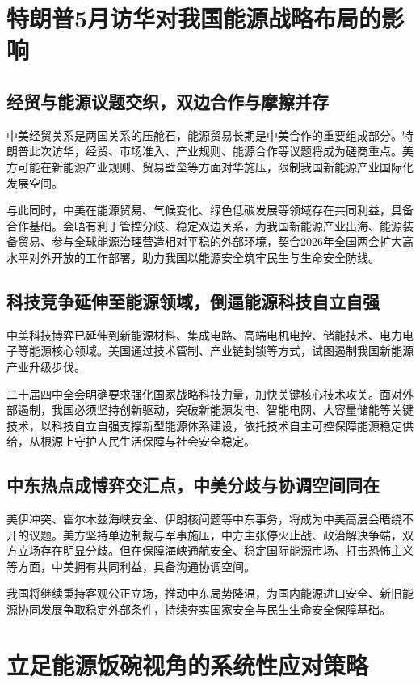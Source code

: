 \documentclass[12pt,a4paper,UTF8]{article}
\begin{document}
\section{特朗普5月访华对我国能源战略布局的影响}
\subsection{经贸与能源议题交织，双边合作与摩擦并存}
中美经贸关系是两国关系的压舱石，能源贸易长期是中美合作的重要组成部分。特朗普此次访华，经贸、市场准入、产业规则、能源合作等议题将成为磋商重点。美方可能在新能源产业规则、贸易壁垒等方面对华施压，限制我国新能源产业国际化发展空间。

与此同时，中美在能源贸易、气候变化、绿色低碳发展等领域存在共同利益，具备合作基础。会晤有利于管控分歧、稳定双边关系，为我国新能源产业出海、能源装备贸易、参与全球能源治理营造相对平稳的外部环境，契合2026年全国两会扩大高水平对外开放的工作部署，助力我国以能源安全筑牢民生与生命安全防线。

\subsection{科技竞争延伸至能源领域，倒逼能源科技自立自强}
中美科技博弈已延伸到新能源材料、集成电路、高端电机电控、储能技术、电力电子等能源核心领域。美国通过技术管制、产业链封锁等方式，试图遏制我国新能源产业升级步伐。

二十届四中全会明确要求强化国家战略科技力量，加快关键核心技术攻关。面对外部遏制，我国必须坚持创新驱动，突破新能源发电、智能电网、大容量储能等关键技术，以科技自立自强支撑新型能源体系建设，依托技术自主可控保障能源稳定供给，从根源上守护人民生活保障与社会安全稳定。

\subsection{中东热点成博弈交汇点，中美分歧与协调空间同在}
美伊冲突、霍尔木兹海峡安全、伊朗核问题等中东事务，将成为中美高层会晤绕不开的议题。美方坚持单边制裁与军事施压，中方主张停火止战、政治解决争端，双方立场存在明显分歧。但在保障海峡通航安全、稳定国际能源市场、打击恐怖主义等方面，中美拥有共同利益，具备沟通协调空间。

我国将继续秉持客观公正立场，推动中东局势降温，为国内能源进口安全、新旧能源协同发展争取稳定外部条件，持续夯实国家安全与民生生命安全保障基础。

\section{立足能源饭碗视角的系统性应对策略}
\end{document}
